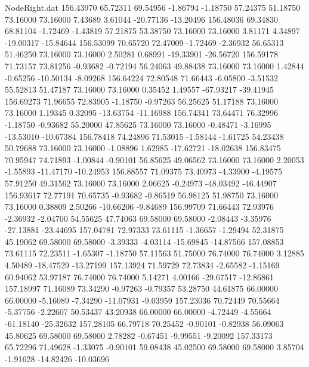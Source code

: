\begin{filecontents}{NodeRight.dat}
 156.43970   65.72311   69.54956    -1.86794   -1.18750   57.24375   51.18750   73.16000   73.16000    7.43689    3.61044  -20.77136  -13.20496
 156.48036   69.34830   68.81104    -1.72469   -1.43819   57.21875   53.38750   73.16000   73.16000    3.81171    4.34897  -19.00317  -15.84644
 156.53099   70.65720   72.47009    -1.72469   -2.36932   56.65313   51.46250   73.16000   73.16000    2.50281    0.68991  -19.33901  -26.56720
 156.59178   71.73157   73.81256    -0.93682   -0.72194   56.24063   49.88438   73.16000   73.16000    1.42844   -0.65256  -10.50134   -8.09268
 156.64224   72.80548   71.66443    -6.05800   -3.51532   55.52813   51.47187   73.16000   73.16000    0.35452    1.49557  -67.93217  -39.41945
 156.69273   71.96655   72.83905    -1.18750   -0.97263   56.25625   51.17188   73.16000   73.16000    1.19345    0.32095  -13.63754  -11.16988
 156.74341   73.64471   76.32996    -1.18750   -0.93682   55.20000   47.85625   73.16000   73.16000   -0.48471   -3.16995  -13.53010  -10.67384
 156.78418   74.24896   71.53015    -1.58144   -1.61725   54.23438   50.79688   73.16000   73.16000   -1.08896    1.62985  -17.62721  -18.02638
 156.83475   70.95947   74.71893    -1.00844   -0.90101   56.85625   49.06562   73.16000   73.16000    2.20053   -1.55893  -11.47170  -10.24953
 156.88557   71.09375   73.40973    -4.33900   -4.19575   57.91250   49.31562   73.16000   73.16000    2.06625   -0.24973  -48.03492  -46.44907
 156.93617   72.77191   70.65735    -0.93682   -0.86519   56.98125   51.98750   73.16000   73.16000    0.38809    2.50266  -10.66206   -9.84689
 156.99709   71.66443   72.93976    -2.36932   -2.04700   54.55625   47.74063   69.58000   69.58000   -2.08443   -3.35976  -27.13881  -23.44695
 157.04781   72.97333   73.61115    -1.36657   -1.29494   52.31875   45.19062   69.58000   69.58000   -3.39333   -4.03114  -15.69845  -14.87566
 157.08853   73.61115   72.23511    -1.65307   -1.18750   57.11563   51.75000   76.74000   76.74000    3.12885    4.50489  -18.47529  -13.27199
 157.13924   71.59729   72.73834    -2.65582   -1.15169   60.94062   53.97187   76.74000   76.74000    5.14271    4.00166  -29.67517  -12.86861
 157.18997   71.16089   73.34290    -0.97263   -0.79357   53.28750   44.61875   66.00000   66.00000   -5.16089   -7.34290  -11.07931   -9.03959
 157.23036   70.72449   70.55664    -5.37756   -2.22607   50.53437   43.20938   66.00000   66.00000   -4.72449   -4.55664  -61.18140  -25.32632
 157.28105   66.79718   70.25452    -0.90101   -0.82938   56.09063   45.80625   69.58000   69.58000    2.78282   -0.67451   -9.99551   -9.20092
 157.33173   65.72296   71.49628    -1.33075   -0.90101   59.08438   45.02500   69.58000   69.58000    3.85704   -1.91628  -14.82426  -10.03696

\end{filecontents}
